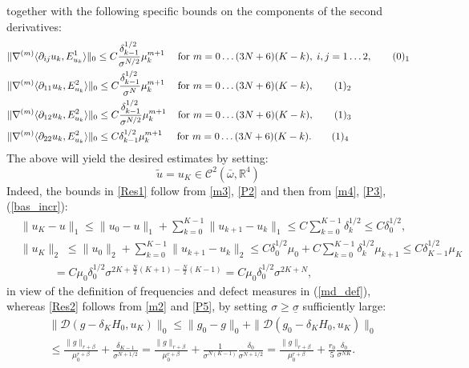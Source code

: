 \documentclass[reqno,twoside,11pt]{amsart}
\newcommand{\R}{\mathbb{R}}
\numberwithin{equation}{section}
\theoremstyle{plain}
\theoremstyle{definition}
\begin{document}
together with the following specific bounds on the components of the second derivatives:
\begin{align*}
& \|\nabla^{(m)}\langle \partial_{ij}u_k, E^1_{u_k}\rangle\|_0 \leq
C\frac{\delta_{k-1}^{1/2}}{\sigma^{N/2}} \mu_k^{m+1}\; \quad\mbox{for }
m=0\ldots (3N+6)(K-k),\; i,j=1\ldots 2,
\tag*{(\theequation)$_1$}\refstepcounter{equation} \label{Q1} \\
& \|\nabla^{(m)}\langle \partial_{11}u_k, E^2_{u_k}\rangle\|_0 \leq
C\frac{\delta_{k-1}^{1/2}}{\sigma^{N}} \mu_k^{m+1}\; \quad\mbox{for }
m=0\ldots (3N+6)(K-k),
\tag*{(\theequation)$_2$} \label{Q2} \\
& \|\nabla^{(m)}\langle \partial_{12}u_k, E^2_{u_k}\rangle\|_0 \leq
C\frac{\delta_{k-1}^{1/2}}{\sigma^{N/2}} \mu_k^{m+1} \hspace{0.5mm}
\quad\mbox{for } m=0\ldots (3N+6)(K-k),
\tag*{(\theequation)$_3$} \label{Q3} \\
& \|\nabla^{(m)}\langle \partial_{22}u_k, E^2_{u_k}\rangle\|_0 \leq
C{\delta_{k-1}^{1/2}}\mu_k^{m+1}\quad\;\,\mbox{for } m=0\ldots (3N+6)(K-k).
\tag*{(\theequation)$_4$} \label{Q4}
\end{align*}
The above will yield the desired estimates by setting:
$$\tilde u = u_K\in\mathcal{C}^2(\bar\omega,\R^4)$$
Indeed, the bounds in \ref{Res1} follow from \ref{m3}, \ref{P2} and
then from \ref{m4}, \ref{P3}, (\ref{bas_incr}):
\begin{equation*}
\begin{split}
& \|u_K-u\|_1\leq \|u_0-u\|_1 + \sum_{k=0}^{K-1}\|u_{k+1}-u_k\|_1 \leq 
C \sum_{k=0}^{K-1}\delta_{k}^{1/2}\leq C\delta_0^{1/2},\\
& \|u_K\|_2\;\leq \|u_0\|_2 + \sum_{k=0}^{K-1}\|u_{k+1}-u_k\|_2\leq 
C\delta_0^{1/2} \mu_0 + C\sum_{k=0}^{K-1}\delta_k^{1/2}\mu_{k+1}\leq C
\delta_{K-1}^{1/2}\mu_{K} \\ & \qquad\quad 
= C\mu_0\delta_0^{1/2} \sigma^{2K+\frac{N}{2}(K+1)-\frac{N}{2}(K-1)}=
C\mu_0\delta_0^{1/2} \sigma^{2K+N},
\end{split}
\end{equation*}
in view of the definition of frequencies and defect measures in (\ref{md_def}),
whereas \ref{Res2} follows from \ref{m2} and \ref{P5}, by setting
$\sigma\geq \underline\sigma$ sufficiently large:
\begin{equation*}
\begin{split}
& \|\mathcal{D}(g-\delta_KH_0,u_K)\|_0\leq \|g_0-g\|_0 + \|\mathcal{D}(g_0-\delta_KH_0,u_K)\|_0
\\ & \leq \frac{\|g\|_{r+\beta}}{\mu_0^{r+\beta}} + \frac{\delta_{K-1}}{\sigma^{N+1/2}} = 
\frac{\|g\|_{r+\beta}}{\mu_0^{r+\beta}} + \frac{1}{\sigma^{N(K-1)}}
\frac{\delta_{0}}{\sigma^{N+1/2}}  = \frac{\|g\|_{r+\beta}}{\mu_0^{r+\beta}} 
+ \frac{r_0}{5} \frac{\delta_{0}}{\sigma^{NK}}.
\end{split}
\end{equation*}
\end{document}
